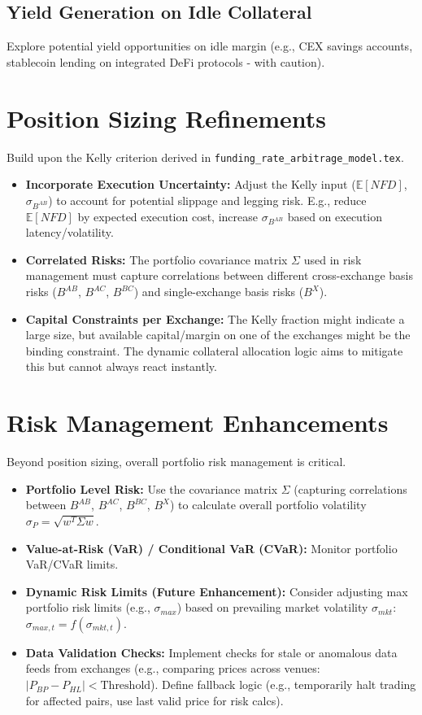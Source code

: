 \documentclass{article}
\begin{document}
\subsection{Yield Generation on Idle Collateral}
Explore potential yield opportunities on idle margin (e.g., CEX savings accounts, stablecoin lending on integrated DeFi protocols - with caution).

\section{Position Sizing Refinements}
Build upon the Kelly criterion derived in \texttt{funding\_rate\_arbitrage\_model.tex}.
\begin{itemize}
    \item \textbf{Incorporate Execution Uncertainty:} Adjust the Kelly input ($\mathbb{E}[NFD]$, $\sigma_{B^{AB}}$) to account for potential slippage and legging risk. E.g., reduce $\mathbb{E}[NFD]$ by expected execution cost, increase $\sigma_{B^{AB}}$ based on execution latency/volatility.
    \item \textbf{Correlated Risks:} The portfolio covariance matrix $\Sigma$ used in risk management must capture correlations between different cross-exchange basis risks ($B^{AB}$, $B^{AC}$, $B^{BC}$) and single-exchange basis risks ($B^X$).
    \item \textbf{Capital Constraints per Exchange:} The Kelly fraction might indicate a large size, but available capital/margin on one of the exchanges might be the binding constraint. The dynamic collateral allocation logic aims to mitigate this but cannot always react instantly.
\end{itemize}

\section{Risk Management Enhancements}
Beyond position sizing, overall portfolio risk management is critical.
\begin{itemize}
    \item \textbf{Portfolio Level Risk:} Use the covariance matrix $\Sigma$ (capturing correlations between $B^{AB}$, $B^{AC}$, $B^{BC}$, $B^X$) to calculate overall portfolio volatility $\sigma_P = \sqrt{w^T \Sigma w}$.
    \item \textbf{Value-at-Risk (VaR) / Conditional VaR (CVaR):} Monitor portfolio VaR/CVaR limits.
    \item \textbf{Dynamic Risk Limits (Future Enhancement):} Consider adjusting max portfolio risk limits (e.g., $\sigma_{max}$) based on prevailing market volatility $\sigma_{mkt}$: $\sigma_{max, t} = f(\sigma_{mkt, t})$.
    \item \textbf{Data Validation Checks:} Implement checks for stale or anomalous data feeds from exchanges (e.g., comparing prices across venues: $|P_{BP} - P_{HL}| < \text{Threshold}$). Define fallback logic (e.g., temporarily halt trading for affected pairs, use last valid price for risk calcs).
\end{itemize}
\end{document}
